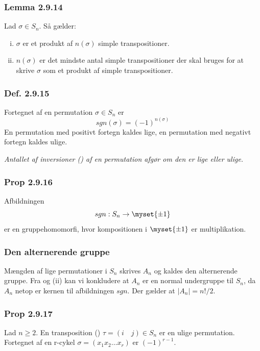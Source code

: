 \subsubsection{Lemma 2.9.14}
Lad $\sigma \in S_n$. Så gælder:
\begin{enumerate}[(i)]
  \item $\sigma$ er et produkt af $n(\sigma)$ simple transpositioner.
  \item $n(\sigma)$ er det mindste antal simple transpositioner der skal bruges
  for at skrive $\sigma$ som et produkt af simple transpositioner.
\end{enumerate}

\subsubsection{Def. 2.9.15}
Fortegnet af en permutation $\sigma \in S_n$ er
\begin{equation*}
  sgn(\sigma) = (-1)^{n(\sigma)}
\end{equation*}
En permutation med positivt fortegn kaldes lige, en permutation med negativt
fortegn kaldes ulige.

\textit{Antallet af inversioner () af en permutation afgør om den er
lige eller ulige.}

\subsubsection{Prop 2.9.16}
\label{2.9.16}
Afbildningen
\begin{equation*}
  sgn: S_n \rightarrow \myset{\pm 1}
\end{equation*}
er en gruppehomomorfi, hvor kompositionen i $\myset{\pm 1}$ er multiplikation.

\subsubsection{Den alternerende gruppe}
Mængden af lige permutationer i $S_n$ skrives $A_n$ og kaldes den alternerende
gruppe. Fra  og  (ii) kan vi konkludere at $A_n$ er en
normal undergruppe til $S_n$, da $A_n$ netop er kernen til afbildningen $sgn$.
Der gælder at $|A_n| = n! / 2$.

\subsubsection{Prop 2.9.17}
Lad $n \geq 2$. En transposition () $\tau = (i \quad j) \in
S_n$ er en ulige permutation. Fortegnet af en r-cykel $\sigma = (x_1 x_2 \ldots
x_r)$ er $(-1)^{r-1}$.

